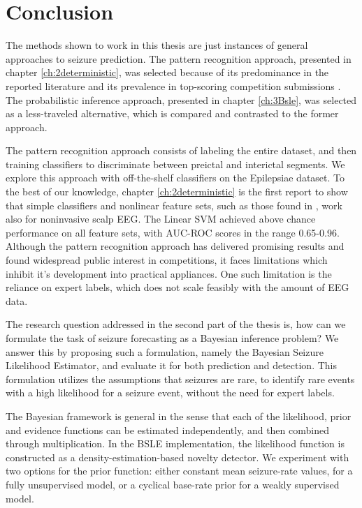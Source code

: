 \chapter{Conclusion}
\label{ch:4conclusion}
The methods shown to work in this thesis are just instances of general approaches to seizure prediction. The pattern recognition approach, presented in chapter \ref{ch:2deterministic}, was selected because of its predominance in the reported literature and its prevalence in top-scoring competition submissions \cite{kaggle2014contests}. The probabilistic inference approach, presented in chapter \ref{ch:3Bsle}, was selected as a less-traveled alternative, which is compared and contrasted to the former approach.

The pattern recognition approach consists of labeling the entire dataset, and then training classifiers to discriminate between preictal and interictal segments. We explore this approach with off-the-shelf classifiers on the Epilepsiae \cite{ihle2012epilepsiae} dataset. To the best of our knowledge, chapter \ref{ch:2deterministic} is the first report to show that simple classifiers and nonlinear feature sets, such as those found in \cite{mirowski2009classification}, work also for noninvasive scalp EEG. The Linear SVM achieved above chance performance on all feature sets, with AUC-ROC scores in the range 0.65-0.96. Although the pattern recognition approach has delivered promising results and found widespread public interest in competitions, it faces limitations which inhibit it's development into practical appliances. One such limitation is the reliance on expert labels, which does not scale feasibly with the amount of EEG data.


The research question addressed in the second part of the thesis is, how can we formulate the task of seizure forecasting as a Bayesian inference problem? We answer this by proposing such a formulation, namely the Bayesian Seizure Likelihood Estimator, and evaluate it for both prediction and detection. This formulation utilizes the assumptions that seizures are rare, to identify rare events with a high likelihood for a seizure event, without the need for expert labels. 

The Bayesian framework is general in the sense that each of the likelihood, prior and evidence functions can be estimated independently, and then combined through multiplication. In the BSLE implementation, the likelihood function is constructed as a density-estimation-based novelty detector. We experiment with two options for the prior function: either constant mean seizure-rate values, for a fully unsupervised model, or a cyclical base-rate prior for a weakly supervised model.

